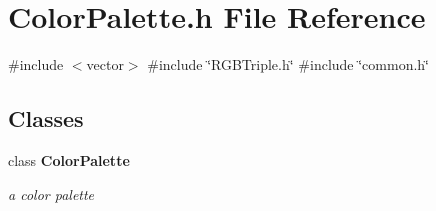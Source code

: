 \section{Color\+Palette.\+h File Reference}
\label{ColorPalette_8h}
{\ttfamily \#include $<$vector$>$}\newline
{\ttfamily \#include \char`\"{}R\+G\+B\+Triple.\+h\char`\"{}}\newline
{\ttfamily \#include \char`\"{}common.\+h\char`\"{}}\newline
\subsection*{Classes}
\begin{DoxyCompactItemize}
\item 
class \textbf{ Color\+Palette}
\begin{DoxyCompactList}\small\item\em a color palette \end{DoxyCompactList}\end{DoxyCompactItemize}
